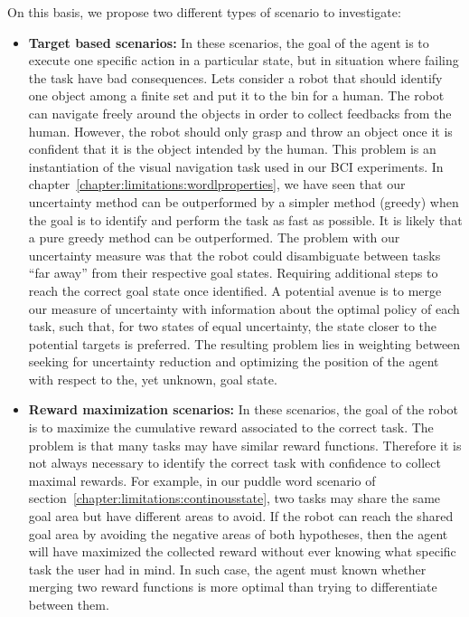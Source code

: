 On this basis, we propose two different types of scenario to investigate: 
\begin{itemize}
\item \textbf{Target based scenarios:} In these scenarios, the goal of the agent is to execute one specific action in a particular state, but in situation where failing the task have bad consequences. 
Lets consider a robot that should identify one object among a finite set and put it to the bin for a human. The robot can navigate freely around the objects in order to collect feedbacks from the human. However, the robot should only grasp and throw an object once it is confident that it is the object intended by the human. 
This problem is an instantiation of the visual navigation task used in our BCI experiments. In chapter~\ref{chapter:limitations:wordlproperties}, we have seen that our uncertainty method can be outperformed by a simpler method (greedy) when the goal is to identify and perform the task as fast as possible. It is likely that a pure greedy method can be outperformed. The problem with our uncertainty measure was that the robot could disambiguate between tasks ``far away'' from their respective goal states. Requiring additional steps to reach the correct goal state once identified. A potential avenue is to merge our measure of uncertainty with information about the optimal policy of each task, such that, for two states of equal uncertainty, the state closer to the potential targets is preferred. The resulting problem lies in weighting between seeking for uncertainty reduction and optimizing the position of the agent with respect to the, yet unknown, goal state.


\item \textbf{Reward maximization scenarios:} In these scenarios, the goal of the robot is to maximize the cumulative reward associated to the correct task. The problem is that many tasks may have similar reward functions. Therefore it is not always necessary to identify the correct task with confidence to collect maximal rewards. For example, in our puddle word scenario of section~\ref{chapter:limitations:continousstate}, two tasks may share the same goal area but have different areas to avoid. If the robot can reach the shared goal area by avoiding the negative areas of both hypotheses, then the agent will have maximized the collected reward without ever knowing what specific task the user had in mind. In such case, the agent must known whether merging two reward functions is more optimal than trying to differentiate between them.
\end{itemize}
